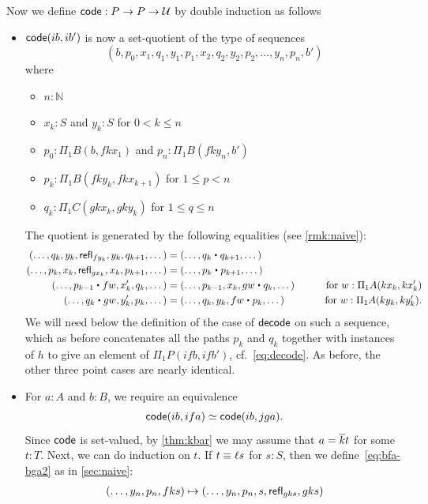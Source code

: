 Now we define $\mathsf{code}:P\to P\to \mathcal{U}$ by double induction as follows
\begin{itemize}
\item $\mathsf{code}(ib,ib')$ is now a set-quotient of the type of sequences
  \[ (b, p_0, x_1, q_1, y_1, p_1, x_2, q_2, y_2, p_2, \dots, y_n, p_n, b') \]
  where
  \begin{itemize}
  \item $n:\mathbb{N}$
  \item $x_k:S$ and $y_k:S$ for $0<k \le n$
  \item $p_0:\Pi_1B(b,f k x_1)$ and $p_n:\Pi_1B(f k y_n, b')$
  \item $p_k:\Pi_1B(fk y_k, fkx_{k+1})$ for $1\le p < n$
  \item $q_k:\Pi_1C(gkx_k, gky_k)$ for $1\le q\le n$
  \end{itemize}
  The quotient is generated by the following equalities (see \autoref{rmk:naive}):
  \begin{alignat*}{2}
    (\dots, q_k, y_k, \refl{fy_k}, y_k, q_{k+1},\dots)
    &= (\dots, q_k\ct q_{k+1},\dots)\\
    (\dots, p_k, x_k, \refl{gx_k}, x_k, p_{k+1},\dots)
    &= (\dots, p_k\ct p_{k+1},\dots)\\
    (\dots, p_{k-1} \ct fw, x_{k}', q_{k}, \dots) &=
    (\dots, p_{k-1}, x_{k}, gw \ct q_{k}, \dots)
    & \qquad\text{for } w:\Pi_1A(kx_{k},kx_{k}')\\
    (\dots, q_k \ct gw, y_k', p_k, \dots) &=
    (\dots, q_k, y_k, fw \ct p_k, \dots)
    & \qquad\text{for } w:\Pi_1A(ky_k, ky_k').
  \end{alignat*}
  We will need below the definition of the case of $\mathsf{decode}$ on such a sequence, which as before concatenates all the paths $p_k$ and $q_k$ together with instances of $h$ to give an element of $\Pi_1P(ifb,ifb')$, cf.~\eqref{eq:decode}.
  As before, the other three point cases are nearly identical.
\item For $a:A$ and $b:B$, we require an equivalence
  \begin{equation}
    \code(ib, ifa) \simeq \code(ib,jga).\label{eq:bfa-bga2}
  \end{equation}
  Since $\mathsf{code}$ is set-valued, by \autoref{thm:kbar} we may assume that $a=\overline{k} t$ for some $t:T$.
  Next, we can do induction on $t$.
  If $t\equiv \ell s$ for $s:S$, then we define~\eqref{eq:bfa-bga2} as in \autoref{sec:naive}:
  \begin{align*}
    (\dots, y_n, p_n,fks) &\mapsto (\dots,y_n,p_n,s,\refl{gks},gks)\\

\end{align*}
\end{itemize}
